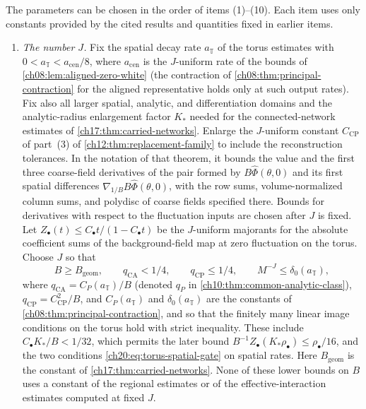 \begin{theorem}
The parameters can be chosen in the order of items \textup{(1)}--\textup{(10)}. Each item uses only constants provided by the cited results and quantities fixed in earlier items.
\begin{enumerate}[label=(\arabic*)]
\item \emph{The number $J$.} Fix the spatial decay rate $a_{\mathbb T}$ of the torus estimates with $0<a_{\mathbb T}<a_{\mathrm{cen}}/8$, where $a_{\mathrm{cen}}$ is the $J$-uniform rate of the bounds of \cref{ch08:lem:aligned-zero-white} (the contraction of \cref{ch08:thm:principal-contraction} for the aligned representative holds only at such output rates). Fix also all larger spatial, analytic, and differentiation domains and the analytic-radius enlargement factor $K_*$ needed for the connected-network estimates of \cref{ch17:thm:carried-networks}. Enlarge the $J$-uniform constant $C_{\mathrm{CP}}$ of part~(3) of \cref{ch12:thm:replacement-family} to include the reconstruction tolerances. In the notation of that theorem, it bounds the value and the first three coarse-field derivatives of the pair formed by $B\widehat\Phi(\theta,0)$ and its first spatial differences $\nabla_{1/B}B\widehat\Phi(\theta,0)$, with the row sums, volume-normalized column sums, and polydisc of coarse fields specified there. Bounds for derivatives with respect to the fluctuation inputs are chosen after $J$ is fixed. Let $Z_\bullet(t)\le C_\bullet t/(1-C_\bullet t)$ be the $J$-uniform majorants for the absolute coefficient sums of the background-field map at zero fluctuation on the torus. Choose $J$ so that
\[
 B\ge B_{\mathrm{geom}},\qquad q_{\mathrm{CA}}<1/4,\qquad q_{\mathrm{CP}}\le1/4,\qquad M^{-J}\le\delta_0(a_{\mathbb T}),
\]
where $q_{\mathrm{CA}}=C_P(a_{\mathbb T})/B$ (denoted $q_P$ in \cref{ch10:thm:common-analytic-class}), $q_{\mathrm{CP}}=C_{\mathrm{CP}}^2/B$, and $C_P(a_{\mathbb T})$ and $\delta_0(a_{\mathbb T})$ are the constants of \cref{ch08:thm:principal-contraction}, and so that the finitely many linear image conditions on the torus hold with strict inequality. These include $C_\bullet K_*/B<1/32$, which permits the later bound $B^{-1}Z_\bullet(K_*\rho_\bullet)\le\rho_\bullet/16$, and the two conditions \eqref{ch20:eq:torus-spatial-gate} on spatial rates. Here $B_{\mathrm{geom}}$ is the constant of \cref{ch17:thm:carried-networks}. None of these lower bounds on $B$ uses a constant of the regional estimates or of the effective-interaction estimates computed at fixed $J$.


\end{enumerate}
\end{theorem}
